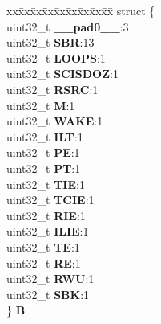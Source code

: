 \begin{DoxyCompactItemize}
\begin{tabbing}
\end{tabbing}\item 
\mbox{\label{unionESCI__tag_1_1ESCI__CR1__tag_a4d3857bb2211747acd7ff70b16af6843}} 
\begin{tabbing}
xx\=xx\=xx\=xx\=xx\=xx\=xx\=xx\=xx\=\kill
struct \{\\
\>uint32\_t {\bfseries \_\_pad0\_\_}:3\\
\>uint32\_t {\bfseries SBR}:13\\
\>uint32\_t {\bfseries LOOPS}:1\\
\>uint32\_t {\bfseries SCISDOZ}:1\\
\>uint32\_t {\bfseries RSRC}:1\\
\>uint32\_t {\bfseries M}:1\\
\>uint32\_t {\bfseries WAKE}:1\\
\>uint32\_t {\bfseries ILT}:1\\
\>uint32\_t {\bfseries PE}:1\\
\>uint32\_t {\bfseries PT}:1\\
\>uint32\_t {\bfseries TIE}:1\\
\>uint32\_t {\bfseries TCIE}:1\\
\>uint32\_t {\bfseries RIE}:1\\
\>uint32\_t {\bfseries ILIE}:1\\
\>uint32\_t {\bfseries TE}:1\\
\>uint32\_t {\bfseries RE}:1\\
\>uint32\_t {\bfseries RWU}:1\\
\>uint32\_t {\bfseries SBK}:1\\
\} {\bfseries B}\\


\end{tabbing}
\end{DoxyCompactItemize}
